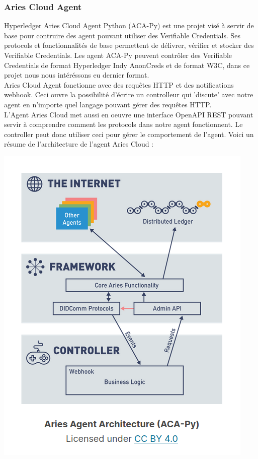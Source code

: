\documentclass[12pt, openany]{report}
\begin{document}
\subsubsection{Aries Cloud Agent}
\noindent 
\begin{flushleft}
Hyperledger Aries Cloud Agent Python (ACA-Py) est une projet visé à servir de base pour contruire des agent pouvant utiliser des Verifiable Credentials. Ses protocols et fonctionnalités de base permettent de délivrer, vérifier et stocker des Verifiable Credentials. Les agent ACA-Py peuvent contrôler des Verifiable Credentials de format Hyperledger Indy AnonCreds et de format W3C, dans ce projet nous nous intéréssons eu dernier format. \\
Aries Cloud Agent fonctionne avec des requêtes HTTP et des notifications webhook. Ceci ouvre la possibilité d'écrire un controlleur qui 'discute' avec notre agent en n'importe quel langage pouvant gérer des requêtes HTTP. \\
L'Agent Aries Cloud met aussi en oeuvre une interface  OpenAPI REST pouvant servir à comprendre comment les protocols dans notre agent fonctionnent. Le controller peut donc utiliser ceci pour gérer le comportement de l'agent. Voici un résume de l'architecture de l'agent Aries Cloud : \\

\begin{center}
\includegraphics[scale=0.6]{ACA-py.png}
\end{center}
\end{flushleft}
\end{document}
